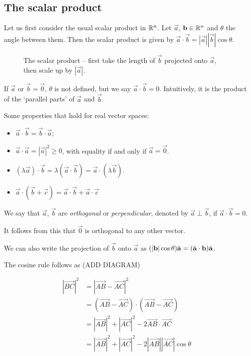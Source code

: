 \documentclass{../../template/note}
\begin{document}
    \subsection{The scalar product}

    Let us first consider the usual scalar product in \(\mathbb R^n\). Let \(\vec a\), \(\vec b \in \RR^n\) and \(\theta\) the angle between them. Then the scalar product is given by \(\vec a \cdot \vec b = |\vec a||\vec b| \cos \theta\).

    \begin{figure}[ht]
        \centering
        \caption{The scalar product -- first take the length of \(\vec b\) projected onto \(\vec a\), then scale up by \(|\vec a|\).}
        \label{fig:dot-product}
    \end{figure}
    
    If \(\vec a\) or \(\vec b = \vec 0\), \(\theta\) is not defined, but we say \(\vec a \cdot \vec b = 0\). Intuitively, it is the product of the `parallel parts' of \(\vec a\) and \(\vec b\).

    Some properties that hold for real vector spaces:

    \begin{itemize}
        \item \(\vec a \cdot \vec b = \vec b \cdot \vec a\);
        \item \(\vec a \cdot \vec a = |\vec a|^2 \geq 0\), with equality if and only if \(\vec a = \vec 0\).
        \item \((\lambda \vec a) \cdot \vec b = \lambda (\vec a \cdot \vec b) = \vec a \cdot (\lambda \vec b)\).
        \item \(\vec a \cdot (\vec b + \vec c) = \vec a \cdot \vec b + \vec a \cdot \vec c\)
    \end{itemize}
    
    We say that \(\vec a\), \(\vec b\) are \emph{orthogonal} or \emph{perpendicular}, denoted by \(\vec a \perp \vec b\), if \(\vec a \cdot \vec b = 0\).

    It follows from this that \(\vec 0\) is orthogonal to any other vector.

    We can also write the projection of \(\vec b\) onto \(\vec a\) as \((|\vec b| \cos \theta) \hvec a = (\hvec a \cdot \vec b) \hvec a\).
    
    The cosine rule follows as (ADD DIAGRAM)
    
    \begin{align*}
        |\overrightarrow{BC}|^2 &= |\overrightarrow{AB} - \overrightarrow{AC}|^2 \\
        &= (\overrightarrow{AB} - \overrightarrow{AC}) \cdot (\overrightarrow{AB} - \overrightarrow{AC}) \\
        &= |\overrightarrow{AB}|^2 + |\overrightarrow{AC}|^2 - 2\overrightarrow{AB} \cdot \overrightarrow{AC} \\
        &= |\overrightarrow{AB}|^2 + |\overrightarrow{AC}|^2 - 2|\overrightarrow{AB}|| \overrightarrow{AC}|\cos\theta \\
    \end{align*}
    
\end{document}

